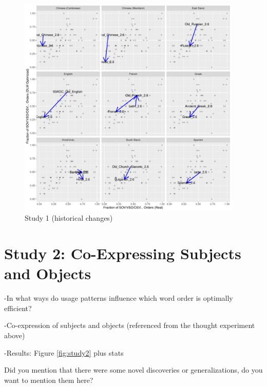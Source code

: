 \documentclass[11pt,a4paper]{article}
\begin{document}
\begin{figure}
    \centering
    \includegraphics[width=0.95\textwidth]{figures/historical_2.6.pdf}
    \caption{Study 1 (historical changes)}
    \label{fig:historical}
\end{figure}




\section{Study 2: Co-Expressing Subjects and Objects}

-In what ways do usage patterns influence which word order is optimally efficient?

-Co-expression of subjects and objects (referenced from the thought experiment above)

-Results: Figure \ref{fig:study2} plus stats

{\color{blue}Did you mention that there were some novel discoveries or generalizations, do you want to mention them here?}
\end{document}
